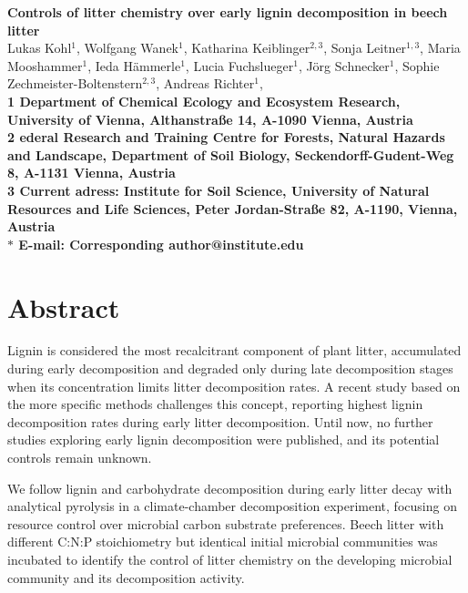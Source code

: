 \documentclass[10pt]{article}
\date{}
\begin{document}
\begin{flushleft}
{\Large
\textbf{Controls of litter chemistry over early lignin decomposition in beech litter}
}
\\
Lukas Kohl$^{1}$, %
Wolfgang Wanek$^{1}$, 
Katharina Keiblinger$^{2,3}$, 
Sonja Leitner$^{1,3}$, 
Maria Mooshammer$^{1}$, 
Ieda H\"ammerle$^{1}$, 
Lucia Fuchslueger$^{1}$, 
J\"org Schnecker$^{1}$, 
Sophie Zechmeister-Boltenstern$^{2,3}$, 
Andreas Richter$^{1}$, 
\\
\bf{1} Department of Chemical Ecology and Ecosystem Research, University of Vienna, Althanstra\ss e 14, A-1090 Vienna, Austria
\\
\bf{2} ederal Research and Training Centre for Forests, Natural Hazards and Landscape, Department of Soil Biology, Seckendorff-Gudent-Weg 8, A-1131 Vienna, Austria
\\
\bf{3} Current adress: Institute for Soil Science, University of Natural Resources and Life Sciences, Peter Jordan-Stra\ss e 82, A-1190, Vienna, Austria
\\
$\ast$ E-mail: Corresponding author@institute.edu
\end{flushleft}

\section*{Abstract}

Lignin is considered the most recalcitrant component of plant litter, accumulated during early decomposition and degraded only during late decomposition stages when its concentration limits litter decomposition rates. A recent study based on the more specific methods challenges this concept, reporting highest lignin decomposition rates during early litter decomposition. Until now, no further studies exploring early lignin decomposition were published, and its potential controls remain unknown.

We follow lignin and carbohydrate decomposition during early litter decay with analytical pyrolysis in a climate-chamber decomposition experiment, focusing on resource control over microbial carbon substrate preferences. Beech litter with different C:N:P stoichiometry but identical initial microbial communities was incubated to identify the control of litter chemistry on the developing microbial community and its decomposition activity. 
\end{document}

